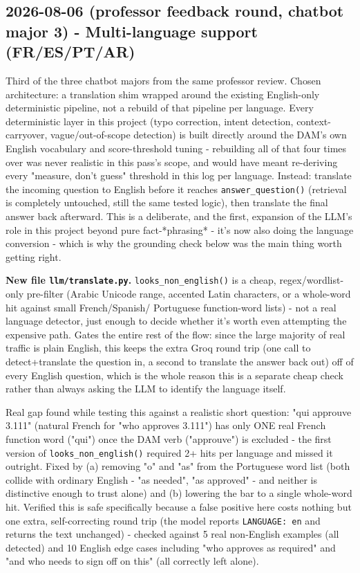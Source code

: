 \subsection*{2026-08-06 (professor feedback round, chatbot major 3) - Multi-language support (FR/ES/PT/AR)}
Third of the three chatbot majors from the same professor review. Chosen architecture: a translation shim wrapped around the existing English-only deterministic pipeline, not a rebuild of that pipeline per language. Every deterministic layer in this project (typo correction, intent detection, context-carryover, vague/out-of-scope detection) is built directly around the DAM's own English vocabulary and score-threshold tuning - rebuilding all of that four times over was never realistic in this pass's scope, and would have meant re-deriving every "measure, don't guess" threshold in this log per language. Instead: translate the incoming question to English before it reaches \texttt{answer\_\allowbreak{}question()} (retrieval is completely untouched, still the same tested logic), then translate the final answer back afterward. This is a deliberate, and the first, expansion of the LLM's role in this project beyond pure fact-*phrasing* - it's now also doing the language conversion - which is why the grounding check below was the main thing worth getting right.

\textbf{New file \texttt{llm/\allowbreak{}translate.py}.} \texttt{looks\_\allowbreak{}non\_\allowbreak{}english()} is a cheap, regex/wordlist-only pre-filter (Arabic Unicode range, accented Latin characters, or a whole-word hit against small French/Spanish/ Portuguese function-word lists) - not a real language detector, just enough to decide whether it's worth even attempting the expensive path. Gates the entire rest of the flow: since the large majority of real traffic is plain English, this keeps the extra Groq round trip (one call to detect+translate the question in, a second to translate the answer back out) off of every English question, which is the whole reason this is a separate cheap check rather than always asking the LLM to identify the language itself.

Real gap found while testing this against a realistic short question: "qui approuve 3.111" (natural French for "who approves 3.111") has only ONE real French function word ("qui") once the DAM verb ("approuve") is excluded - the first version of \texttt{looks\_\allowbreak{}non\_\allowbreak{}english()} required 2+ hits per language and missed it outright. Fixed by (a) removing "o" and "as" from the Portuguese word list (both collide with ordinary English - "as needed", "as approved" - and neither is distinctive enough to trust alone) and (b) lowering the bar to a single whole-word hit. Verified this is safe specifically because a false positive here costs nothing but one extra, self-correcting round trip (the model reports \texttt{LANGUAGE: en} and returns the text unchanged) - checked against 5 real non-English examples (all detected) and 10 English edge cases including "who approves as required" and "and who needs to sign off on this" (all correctly left alone).

